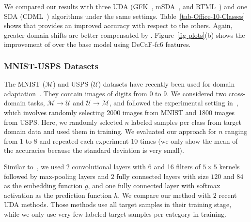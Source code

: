 We compared our results with three UDA (GFK~\cite{gong2012geodesic}, mSDA~\cite{chen2012marginalized}, and RTML~\cite{ding2017robust}) and one SDA (CDML~\cite{wang2014cross}) algorithms under the same settings. Table~\ref{tab-Office-10-Classes} shows that \modelDA provides an improved accuracy with respect to the others. Again, greater domain shifts are better compensated by \modelDA. Figure~\ref{fig-plots}(b) shows the improvement of \modelDA over the base model using DeCaF-fc6 features.

\begin{comment}
\modelDA did not win 3 out of 6 cases. That is most likely attributed to the fact that the network used here is more suitable for sparse features like DeCaF-fc6 than non-sparse features like SURF. Indeed, \modelDA is more suitable for CNN networks followed by fully connected layers.
\end{comment}


\subsubsection{MNIST-USPS Datasets} \label{sec-MNIST-USPS}

The MNIST ($\mathcal{M}$) and USPS ($\mathcal{U}$) datasets have recently been used for domain adaptation~\cite{fernandoTT15prl,rozantsev2016beyond}. They contain images of digits from 0 to 9. We considered two cross-domain tasks, $\mathcal{M} \rightarrow \mathcal{U}$ and $\mathcal{U} \rightarrow \mathcal{M}$, and followed the experimental setting in~\cite{fernandoTT15prl,rozantsev2016beyond}, which involves randomly selecting 2000 images from MNIST and 1800 images from USPS. Here, we randomly selected $n$ labeled samples per class from target domain data and used them in training. We evaluated our approach for $n$ ranging from 1 to 8 and repeated each experiment $10$ times (we only show the mean of the accuracies because the standard deviation is very small).

\begin{comment}
Since the images of the USPS dataset have $16\times16$ pixels, we resized the images of the MNIST dataset to $16\times16$ pixels. 

 where {\tt CCSA-$n$} stands for our method when we use $n$ labeled target samples per category in training.
\end{comment}

Similar to~\cite{lecun1998gradient}, we used $2$ convolutional layers with 6 and 16 filters of $5\times5$ kernels followed by max-pooling layers and $2$ fully connected layers with size $120$ and $84$ as the embedding function $g$, and one fully connected layer with softmax activation as the prediction function $h$. We compare our method with $2$ recent UDA methods. Those methods use all target samples in their training stage, while we only use very few labeled target samples per category in training.

